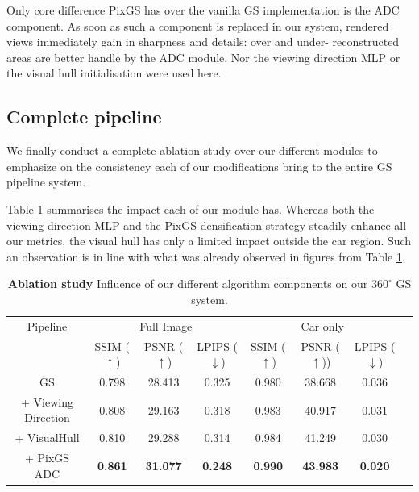 Only core difference PixGS has over the vanilla GS implementation is the ADC component. As soon as such a component is replaced in our system, rendered views immediately gain in sharpness and details: over and under- reconstructed areas are better handle by the ADC module. Nor the viewing direction MLP or the visual hull initialisation were used here. 

\subsection{Complete pipeline}

We finally conduct a complete ablation study over our different modules to emphasize on the consistency each of our modifications bring to the entire GS pipeline system. 

Table \ref{table:gs-abaltion} summarises the impact each of our module has. Whereas both the viewing direction MLP and the PixGS densification strategy steadily enhance all our metrics, the visual hull has only a limited impact outside the car region. Such an observation is in line with what was already observed in figures from Table \ref{table:gs-abaltion}. 

\begin{table}[htp!]
  \caption{\textbf{Ablation study} Influence of our different algorithm components on our $360^{\circ}$ GS system.}
  \label{table:gs-abaltion}
  \begin{adjustbox}{width=\linewidth}
  \begin{tabular}[h]{c||ccccccc}
  \hline
   Pipeline & \multicolumn{3}{c}{Full Image} & \multicolumn{3}{c}{Car only} \\
   &  SSIM ($\uparrow$) & PSNR ($\uparrow$) & LPIPS ($\downarrow$) & SSIM ($\uparrow$) & PSNR ($\uparrow$)) & LPIPS ($\downarrow$)\\
  \hline
  GS \cite{kerbl20233d}  & 0.798  & 28.413 & 0.325 & 0.980 & 38.668 & 0.036 \\
  + Viewing Direction & 0.808 & 29.163 & 0.318 & 0.983 & 40.917  & 0.031 \\
  + VisualHull & 0.810 & 29.288 & 0.314 & 0.984 &41.249  & 0.030 \\
  + PixGS ADC & \textbf{0.861} & \textbf{31.077} & \textbf{0.248} & \textbf{0.990} & \textbf{43.983} & \textbf{0.020} \\
  \hline 
  \end{tabular}
  \end{adjustbox}
  \end{table}

